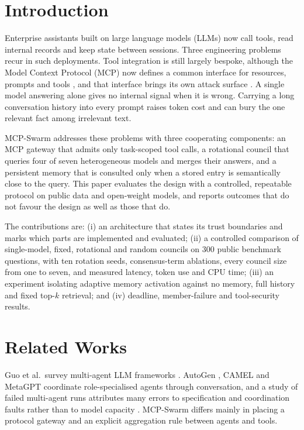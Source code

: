 \section{Introduction}
Enterprise assistants built on large language models (LLMs) now call tools, read internal records and keep state between sessions. Three engineering problems recur in such deployments. Tool integration is still largely bespoke, although the Model Context Protocol (MCP) now defines a common interface for resources, prompts and tools \cite{mcpspec}, and that interface brings its own attack surface \cite{hou2025mcp}. A single model answering alone gives no internal signal when it is wrong. Carrying a long conversation history into every prompt raises token cost and can bury the one relevant fact among irrelevant text.

MCP-Swarm addresses these problems with three cooperating components: an MCP gateway that admits only task-scoped tool calls, a rotational council that queries four of seven heterogeneous models and merges their answers, and a persistent memory that is consulted only when a stored entry is semantically close to the query. This paper evaluates the design with a controlled, repeatable protocol on public data and open-weight models, and reports outcomes that do not favour the design as well as those that do.

The contributions are: (i) an architecture that states its trust boundaries and marks which parts are implemented and evaluated; (ii) a controlled comparison of single-model, fixed, rotational and random councils on 300 public benchmark questions, with ten rotation seeds, consensus-term ablations, every council size from one to seven, and measured latency, token use and CPU time; (iii) an experiment isolating adaptive memory activation against no memory, full history and fixed top-$k$ retrieval; and (iv) deadline, member-failure and tool-security results.

\section{Related Works}
Guo et al.\ survey multi-agent LLM frameworks \cite{guo2024survey}. AutoGen \cite{wu2023autogen}, CAMEL \cite{li2023camel} and MetaGPT \cite{hong2023metagpt} coordinate role-specialised agents through conversation, and a study of failed multi-agent runs attributes many errors to specification and coordination faults rather than to model capacity \cite{cemri2025fail}. MCP-Swarm differs mainly in placing a protocol gateway and an explicit aggregation rule between agents and tools.

